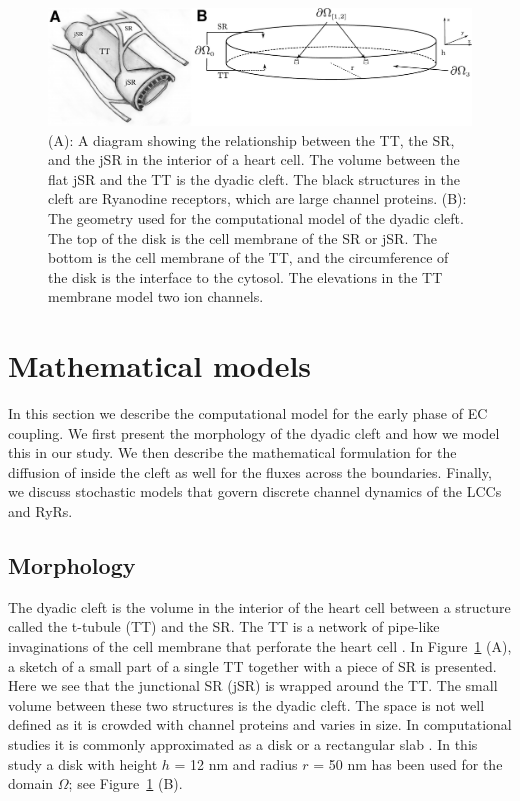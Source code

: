 \begin{figure}
  \centering
  \includegraphics[width=\largefig]{chapters/hake/pdf/morphology}
  \caption[The dyadic cleft]{(A): A diagram showing the
    relationship between the TT, the SR, and the jSR in the interior
    of a heart cell. The volume between the flat jSR and the TT is the
    dyadic cleft. The black structures in the cleft are Ryanodine
    receptors, which are large channel proteins. (B): The
    geometry used for the computational model of the dyadic cleft. The
    top of the disk is the cell membrane of the SR or jSR. The bottom
    is the cell membrane of the TT, and the circumference of the disk
    is the interface to the cytosol. The elevations in the TT membrane
    model two \Ca ion channels.}
\label{fig:hake:morphology}
\end{figure}

\section{Mathematical models}
\label{sec:hake:mathematical-models}

In this section we describe the computational model for the early
phase of EC coupling. We first present the morphology of the dyadic
cleft and how we model this in our study. We then describe the
mathematical formulation for the diffusion of \Ca inside the cleft as
well for the \Ca fluxes across the boundaries. Finally, we discuss
stochastic models that govern discrete channel dynamics of the LCCs
and RyRs.

\subsection{Morphology}
\label{sec:hake:morphology}
  

The dyadic cleft is the volume in the interior of the heart cell
between a structure called the t-tubule (TT) and the SR. The TT is a
network of pipe-like invaginations of the cell membrane that perforate
the heart cell \citep{SoellerCannell1999}. In
Figure~\ref{fig:hake:morphology} (A), a sketch of a small part of
a single TT together with a piece of SR is presented. Here we see that
the junctional SR (jSR) is wrapped around the TT. The small volume
between these two structures is the dyadic cleft. The space is not
well defined as it is crowded with channel proteins and varies in
size. In computational studies it is commonly approximated as a disk
or a rectangular slab
\citep{PeskoffPostLanger1992,SoellerCannell1997,KohSrinivasanChingEtAl2006,
  TanskanenGreensteinChenEtAl2007}. In this study a disk with height
$h$ = 12 nm and radius $r$ = 50 nm has been used for the domain
$\Omega$; see Figure~\ref{fig:hake:morphology} (B).

